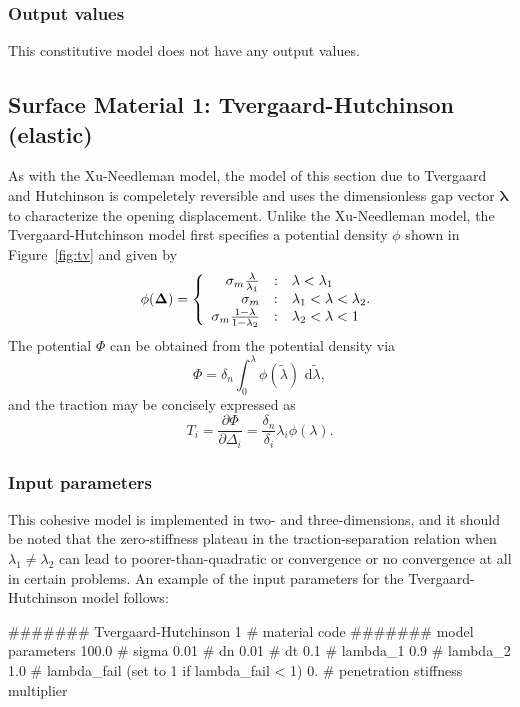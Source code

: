 \subsubsection{Output values}
This constitutive model does not have any output values.

\subsection{Surface Material 1: Tvergaard-Hutchinson (elastic)}
\label{sect.material.surface.tv}
As with the Xu-Needleman model, the model of this section due to Tvergaard
and Hutchinson \cite{Tvergaard1992} is compeletely reversible and uses
the dimensionless gap vector $\boldsymbol{\lambda}$ to characterize the
opening displacement. Unlike the Xu-Needleman model, the Tvergaard-Hutchinson
model first specifies a potential density $\phi$ shown in Figure~\ref{fig:tv} 
and given by
\begin{equation}
\phi(\mathbf{\Delta}) = \left\{
\begin{array}{r@{\quad:\quad}l} 
\sigma_m \frac{\lambda}{\lambda_1} & \lambda < \lambda_1 \\
	\sigma_m & \lambda_1 < \lambda < \lambda_2 .\\
     \sigma_m \frac{1-\lambda}{1-\lambda_2} & \lambda_2 < \lambda < 1
\end{array}
\right.
\end{equation} 
The potential $\Phi$ can be obtained from the potential density via
\begin{equation}
\Phi = \delta_n \int_0^\lambda \phi(\tilde{\lambda}) \mbox{\ d}\tilde{\lambda},
\end{equation}
and the traction may be concisely expressed as
\begin{equation}
\label{eq.tvt}
T_i = \frac{\partial \Phi}{\partial \Delta_i} = \frac{\delta_n}{\delta_i} 
\lambda_i \phi(\lambda).
\end{equation}

\subsubsection{Input parameters}
This cohesive model is implemented in two- and three-dimensions, and it should
be noted that the zero-stiffness plateau in the traction-separation relation
when $\lambda_1 \neq \lambda_2$ can lead to poorer-than-quadratic or 
convergence or no convergence at all in certain problems. 
An example of the input parameters for the Tvergaard-Hutchinson model 
follows: 
\begin{inputfile}
####### Tvergaard-Hutchinson
1     # material code
####### model parameters
100.0 # sigma 
0.01  # dn
0.01  # dt
0.1   # lambda_1
0.9   # lambda_2
1.0   # lambda_fail (set to 1 if lambda_fail < 1)
0.    # penetration stiffness multiplier
\end{inputfile}

